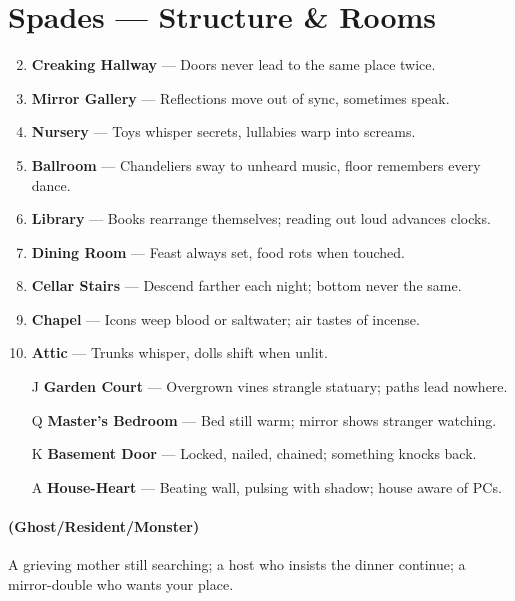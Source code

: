 \documentclass[11pt]{article}
\begin{document}
\section*{Spades --- Structure \& Rooms}
\label{sec:haunted-house-rooms}
\begin{enumerate}
\setcounter{enumi}{1}
\item \textbf{Creaking Hallway} --- Doors never lead to the same place twice.
\item \textbf{Mirror Gallery} --- Reflections move out of sync, sometimes speak.
\item \textbf{Nursery} --- Toys whisper secrets, lullabies warp into screams.
\item \textbf{Ballroom} --- Chandeliers sway to unheard music, floor remembers every dance.
\item \textbf{Library} --- Books rearrange themselves; reading out loud advances clocks.
\item \textbf{Dining Room} --- Feast always set, food rots when touched.
\item \textbf{Cellar Stairs} --- Descend farther each night; bottom never the same.
\item \textbf{Chapel} --- Icons weep blood or saltwater; air tastes of incense.
\item \textbf{Attic} --- Trunks whisper, dolls shift when unlit.
\item[J] \textbf{Garden Court} --- Overgrown vines strangle statuary; paths lead nowhere.
\item[Q] \textbf{Master’s Bedroom} --- Bed still warm; mirror shows stranger watching.
\item[K] \textbf{Basement Door} --- Locked, nailed, chained; something knocks back.
\item[A] \textbf{House-Heart} --- Beating wall, pulsing with shadow; house aware of PCs.
\end{enumerate}

\paragraph*{(Ghost/Resident/Monster)} A grieving mother still searching; a host who insists the dinner continue; a mirror-double who wants your place.
\end{document}
